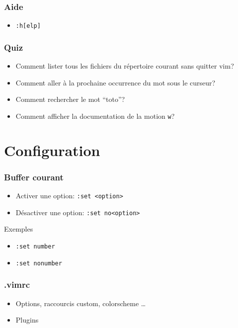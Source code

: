 \documentclass{beamer}
\begin{document}
\begin{frame} \frametitle{Aide}
  \begin{itemize}
    \item {\tt :h[elp]}
  \end{itemize}
\end{frame}
\begin{frame} \frametitle{Quiz}
  \begin{itemize}
    \item Comment lister tous les fichiers du répertoire courant sans quitter
      vim?  \pause
    \item Comment aller à la prochaine occurrence du mot sous le
      curseur? \pause {\tt *} \pause
    \item Comment rechercher le mot ``toto''?  \pause
    \item Comment afficher la documentation de la motion {\tt w}? 
  \end{itemize}
\end{frame}


\section{Configuration}
\begin{frame} \frametitle{Buffer courant}
  \begin{itemize}
    \item Activer une option: {\tt :set <option>}
    \item Désactiver une option: {\tt :set no<option>}
  \end{itemize}
  \pause
  \begin{block}{Exemples}
    \begin{itemize}
      \item {\tt :set number}
      \item {\tt :set nonumber}
    \end{itemize}
  \end{block}
\end{frame}
\begin{frame} \frametitle{.vimrc}
  \begin{itemize}
    \item Options, raccourcis custom, colorscheme \dots
    \item Plugins
  \end{itemize}
  \pause
\end{frame}
\end{document}
